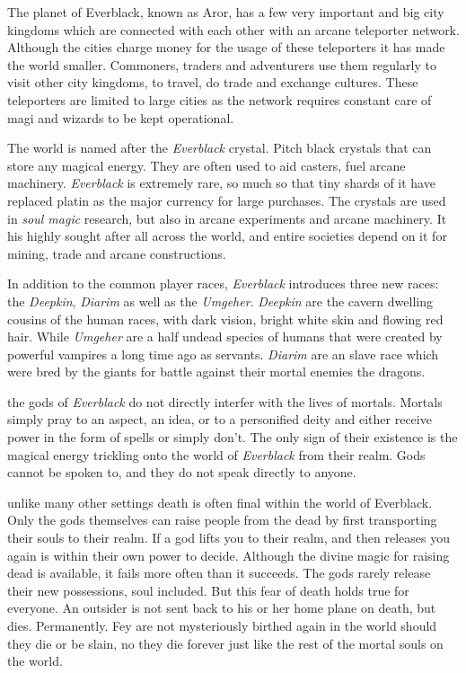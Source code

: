 \begin{enumerate}
  The planet of Everblack, known as Aror, has a
 few very important and big city kingdoms which are connected with each other
 with an arcane teleporter network. Although the cities charge money for the
 usage of these teleporters it has made the world smaller. Commoners, traders
 and adventurers use them regularly to visit other city kingdoms, to travel,
 do trade and exchange cultures. These teleporters are limited to large cities
 as the network requires constant care of magi and wizards to be kept
 operational.

  The world is named after the \emph{Everblack} crystal. Pitch
 black crystals that can store any magical energy. They are often used to aid
 casters, fuel arcane machinery. \emph{Everblack} is extremely rare, so much so
 that tiny shards of it have replaced platin as the major currency for large
 purchases. The crystals are used in \emph{soul magic} research, but also in
 arcane experiments and arcane machinery. It his highly sought after all across
 the world, and entire societies depend on it for mining, trade and arcane
 constructions.

  In addition to the common player races, \emph{Everblack}
 introduces three new races: the \emph{Deepkin}, \emph{Diarim} as well as
 the \emph{Umgeher}.  \emph{Deepkin} are the cavern dwelling cousins of the
 human races, with dark vision, bright white skin and flowing red
 hair. While \emph{Umgeher} are a half undead species of humans that were
 created by powerful vampires a long time ago as servants. \emph{Diarim} are
 an slave race which were bred by the giants for battle against their mortal
 enemies the dragons.

  the gods of \emph{Everblack} do not directly
 interfer with the lives of mortals. Mortals simply pray to an aspect, an idea,
 or to a personified deity and either receive power in the form of spells or
 simply don't. The only sign of their existence is the magical energy trickling
 onto the world of \emph{Everblack} from their realm. Gods cannot be spoken to,
 and they do not speak directly to anyone.

  unlike many other settings death is often final
 within the world of Everblack. Only the gods themselves can raise people from
 the dead by first transporting their souls to their realm. If a god lifts you
 to their realm, and then releases you again is within their own power to
 decide. Although the divine magic for raising dead is available, it fails more
 often than it succeeds. The gods rarely release their new possessions, soul
 included. But this fear of death holds true for everyone. An outsider is not
 sent back to his or her home plane on death, but dies. Permanently. Fey are
 not mysteriously birthed again in the world should they die or be slain, no
 they die forever just like the rest of the mortal souls on the world.

\end{enumerate}

